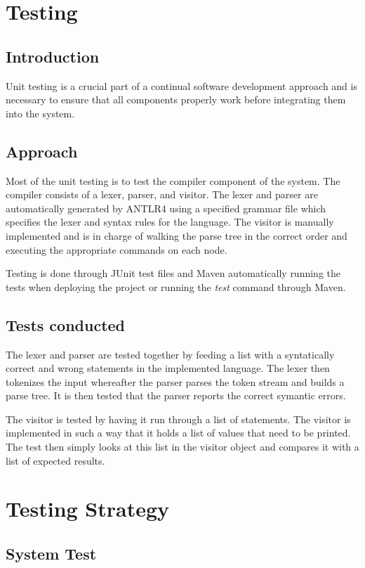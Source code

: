 \documentclass[english]{article}
\begin{document}
	\section{Testing}
		\subsection{Introduction}
			Unit testing is a crucial part of a continual software development approach and is necessary to ensure that all components properly work before integrating them into the system.
		\subsection{Approach}
			Most of the unit testing is to test the compiler component of the system. The compiler consists of a lexer, parser, and visitor. The lexer and parser are automatically generated by ANTLR4 using a specified grammar file which specifies the lexer and syntax rules for the language. The visitor is manually implemented and is in charge of walking the parse tree in the correct order and executing the appropriate commands on each node.
			
			Testing is done through JUnit test files and Maven automatically running the tests when deploying the project or running the \textit{test} command through Maven.
		\subsection{Tests conducted}
			The lexer and parser are tested together by feeding a list with a syntatically correct and wrong statements in the implemented language. The lexer then tokenizes the input whereafter the parser parses the token stream and builds a parse tree. It is then tested that the parser reports the correct symantic errors.
			
			The visitor is tested by having it run through a list of statements. The visitor is implemented in such a way that it holds a list of values that need to be printed. The test then simply looks at this list in the visitor object and compares it with a list of expected results.
		
	\section{Testing Strategy}
		\subsection{System Test}
\end{document}
